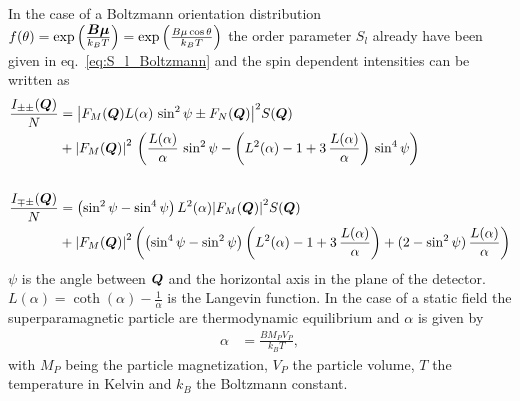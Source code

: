 In the case of a Boltzmann orientation distribution
$f(\theta)=\exp\left(\frac{\BM{B\mu}}{k_BT}\right)=\exp\left(\frac{B\mu\cos\theta}{k_BT}\right)$
the order parameter $S_l$ already have been given in eq.\
\ref{eq:S_l_Boltzmann} and the spin dependent intensities can be
written as
\begin{subequations}
\begin{align}
\frac{I_{\pm\pm}(\BM{Q})}{N} &= \abs{F_M(\BM{Q})
L(\alpha)\,\sin^2\psi
     \pm F_N(\BM{Q})}^2 S(\BM{Q}) \\
&+ \abs{F_M(\BM{Q})}^2\, \left( \frac{L(\alpha)}{\alpha}\,
\sin^2\psi - \left( L^2(\alpha)-1+3\,\frac{L(\alpha)}{\alpha}\right)
\, \sin^4\psi \right) \nonumber \\
\nonumber \\
\frac{I_{\mp\pm}(\BM{Q})}{N} &= \left( \sin^2\psi - \sin^4\psi
\right) L^2(\alpha)
\abs{F_M(\BM{Q})}^2 S(\BM{Q}) \\
&+ \abs{F_M(\BM{Q})}^2  \left( \left( \sin^4\psi-\sin^2\psi \right)
\left( L^2(\alpha)-1+3\, \frac{L(\alpha)}{\alpha}\right) +
(2-\sin^2\psi)\, \frac{L(\alpha)}{\alpha}\right) \nonumber
\end{align}
\end{subequations}
$\psi$ is the angle between $\BM{Q}$ and the horizontal axis in the
plane of the detector. $L(\alpha)=\coth(\alpha)-\frac{1}{\alpha}$ is
the Langevin function. In the case of a static field the
superparamagnetic particle are thermodynamic equilibrium and
$\alpha$ is given by
\begin{align}
\alpha&=\frac{BM_PV_P}{k_B T},
\end{align}
with $M_P$ being the particle magnetization, $V_P$ the particle
volume, $T$ the temperature in Kelvin and $k_B$ the Boltzmann
constant.
\clearpage 